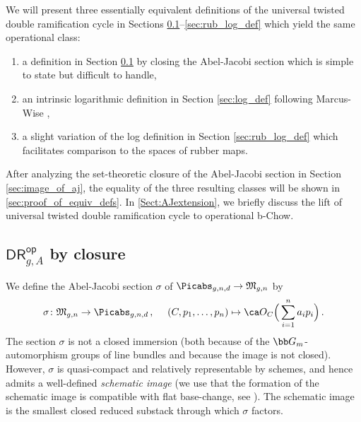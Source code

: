 We will present three essentially equivalent definitions of the universal
twisted double ramification cycle
in Sections \ref{sec:naive_def}--\ref{sec:rub_log_def} which yield the same operational class:
\begin{enumerate}
\item[$\bullet$] a definition in Section \ref{sec:naive_def} by closing
the Abel-Jacobi section
which is simple to state but difficult to
handle,
\item[$\bullet$] an intrinsic logarithmic definition in Section
\ref{sec:log_def}
following Marcus-Wise \cite{Marcus2017Logarithmic-com},

\item[$\bullet$] a slight variation of the log definition in
Section \ref{sec:rub_log_def}
which facilitates  comparison to the spaces of rubber maps.
\end{enumerate}
After analyzing the set-theoretic closure of the Abel-Jacobi section in
Section \ref{sec:image_of_aj},
the equality of the three resulting classes will be shown in \cref{sec:proof_of_equiv_defs}.
In \cref{Sect:AJextension}, we briefly discuss
the lift of universal twisted
 double ramification cycle to operational b-Chow.

\subsection{$\mathsf{DR}^{\mathsf{op}}_{g,A}$ by closure}
\label{sec:naive_def}

We define the Abel-Jacobi section $\sigma$ of $\Picabs_{g,n,d} \to \frak M_{g,n}$  by
\begin{equation}
\sigma\colon \frak M_{g,n} \to \Picabs_{g,n,d}\, ,\ \ \ \ (C, p_1, \dots, p_n) \mapsto \ca O_C\Big(\sum_{i=1}^n a_i p_i\Big)\, .
\end{equation}
The section $\sigma$  is not a closed immersion (both because
of the $\bb G_m$-automorphism groups of line bundles and because the
image is not closed).
However, $\sigma$ is quasi-compact and relatively representable by schemes, and hence admits a well-defined \emph{schematic image} (we use that the formation of the schematic image is compatible with flat base-change, see \cite[\href{https://stacks.math.columbia.edu/tag/081I}{Tag 081I}]{stacks-project}).
The schematic image is the smallest closed reduced substack through which
$\sigma$ factors.



